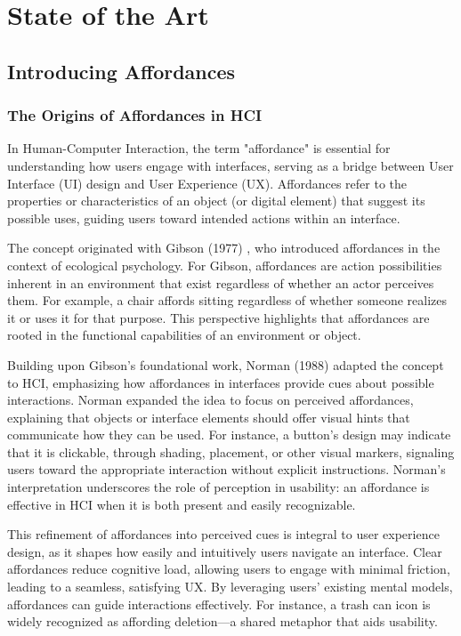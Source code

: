 \section{State of the Art}

\subsection{Introducing Affordances}

\subsubsection{The Origins of Affordances in HCI}

In Human-Computer Interaction, the term "affordance" is essential for understanding how users engage with interfaces, serving as a bridge between User Interface (UI) design and User Experience (UX).
Affordances refer to the properties or characteristics of an object (or digital element) that suggest its possible uses, guiding users toward intended actions within an interface.

The concept originated with Gibson (1977) \cite{gibson1977theory}, who introduced affordances in the context of ecological psychology.
For Gibson, affordances are action possibilities inherent in an environment that exist regardless of whether an actor perceives them.
For example, a chair affords sitting regardless of whether someone realizes it or uses it for that purpose.
This perspective highlights that affordances are rooted in the functional capabilities of an environment or object.

Building upon Gibson's foundational work, Norman (1988) \cite{norman1988psychology} adapted the concept to HCI, emphasizing how affordances in interfaces provide cues about possible interactions.
Norman expanded the idea to focus on perceived affordances, explaining that objects or interface elements should offer visual hints that communicate how they can be used.
For instance, a button's design may indicate that it is clickable, through shading, placement, or other visual markers, signaling users toward the appropriate interaction without explicit instructions.
Norman’s interpretation underscores the role of perception in usability: an affordance is effective in HCI when it is both present and easily recognizable.

This refinement of affordances into perceived cues is integral to user experience design, as it shapes how easily and intuitively users navigate an interface.
Clear affordances reduce cognitive load, allowing users to engage with minimal friction, leading to a seamless, satisfying UX.
By leveraging users' existing mental models, affordances can guide interactions effectively.
For instance, a trash can icon is widely recognized as affording deletion—a shared metaphor that aids usability.

